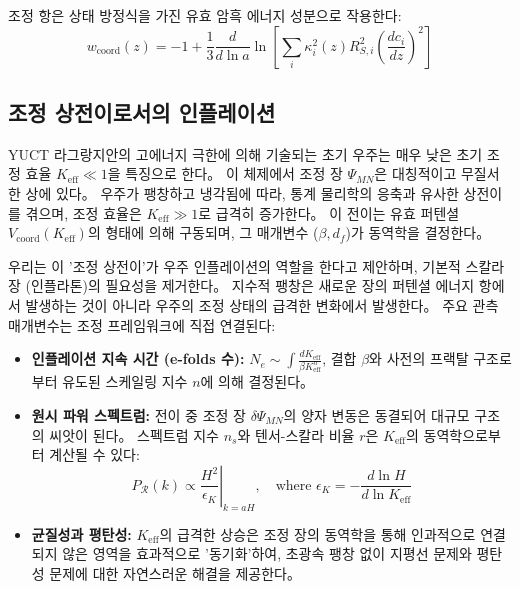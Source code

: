 \documentclass[11pt,a4paper]{article}
\begin{document}
조정 항은 상태 방정식을 가진 유효 암흑 에너지 성분으로 작용한다:
\begin{equation}
w_{\text{coord}}(z) = -1 + \frac{1}{3} \frac{d}{d\ln a} \ln \left[ \sum_i \kappa_i^2(z) R_{S,i}^2 \left(\frac{dc_i}{dz}\right)^2 \right]
\end{equation}

\subsection{조정 상전이로서의 인플레이션}
\label{subsec:inflation-transition}

YUCT 라그랑지안의 고에너지 극한에 의해 기술되는 초기 우주는 매우 낮은 초기 조정 효율 $K_{\mathrm{eff}} \ll 1$을 특징으로 한다。 이 체제에서 조정 장 $\Psi_{MN}$은 대칭적이고 무질서한 상에 있다。 우주가 팽창하고 냉각됨에 따라, 통계 물리학의 응축과 유사한 상전이를 겪으며, 조정 효율은 $K_{\mathrm{eff}} \gg 1$로 급격히 증가한다。 이 전이는 유효 퍼텐셜 $V_{\mathrm{coord}}(K_{\mathrm{eff}})$의 형태에 의해 구동되며, 그 매개변수 ($\beta, d_f$)가 동역학을 결정한다。

우리는 이 '조정 상전이'가 우주 인플레이션의 역할을 한다고 제안하며, 기본적 스칼라 장 (인플라톤)의 필요성을 제거한다。 지수적 팽창은 새로운 장의 퍼텐셜 에너지 항에서 발생하는 것이 아니라 우주의 조정 상태의 급격한 변화에서 발생한다。 주요 관측 매개변수는 조정 프레임워크에 직접 연결된다:

\begin{itemize}
\item \textbf{인플레이션 지속 시간 (e-folds 수):} \(N_e \sim \int \frac{dK_{\mathrm{eff}}}{\beta K_{\mathrm{eff}}^n} \), 결합 \(\beta\)와 사전의 프랙탈 구조로부터 유도된 스케일링 지수 \(n\)에 의해 결정된다。
\item \textbf{원시 파워 스펙트럼:} 전이 중 조정 장 \(\delta \Psi_{MN}\)의 양자 변동은 동결되어 대규모 구조의 씨앗이 된다。 스펙트럼 지수 \(n_s\)와 텐서-스칼라 비율 \(r\)은 \(K_{\mathrm{eff}}\)의 동역학으로부터 계산될 수 있다:
\begin{equation}
	P_{\mathcal{R}}(k) \propto \left. \frac{H^2}{\epsilon_K} \right|_{k=aH}, \quad \text{where } \epsilon_K = -\frac{d\ln H}{d\ln K_{\mathrm{eff}}}
\end{equation}
\item \textbf{균질성과 평탄성:} \(K_{\mathrm{eff}}\)의 급격한 상승은 조정 장의 동역학을 통해 인과적으로 연결되지 않은 영역을 효과적으로 '동기화'하여, 초광속 팽창 없이 지평선 문제와 평탄성 문제에 대한 자연스러운 해결을 제공한다。
\end{itemize}
\end{document}
